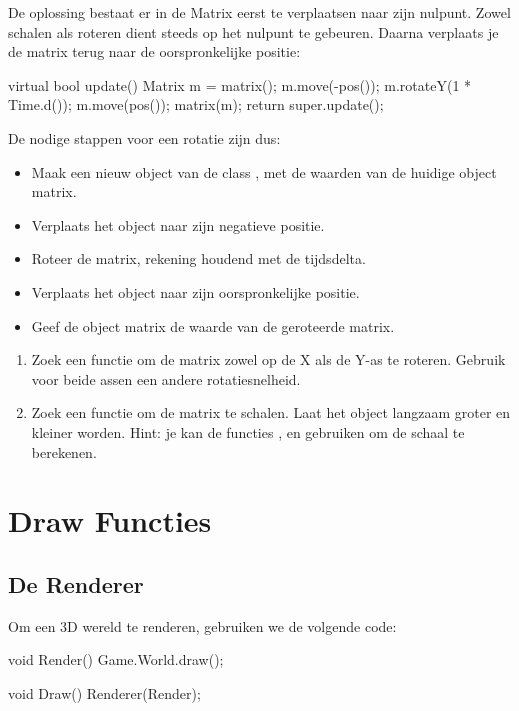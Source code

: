 De oplossing bestaat er in de Matrix eerst te verplaatsen naar zijn nulpunt. Zowel schalen als roteren dient steeds op het nulpunt te gebeuren. Daarna verplaats je de matrix terug naar de oorspronkelijke positie:

\begin{code}
virtual bool update()
{
	Matrix m = matrix();
	m.move(-pos());
	m.rotateY(1 * Time.d());
	m.move(pos());
	matrix(m);
	return super.update();
}
\end{code}

De nodige stappen voor een rotatie zijn dus:
\begin{itemize}
	\item Maak een nieuw object van de class , met de waarden van de huidige object matrix.
	\item Verplaats het object naar zijn negatieve positie.
	\item Roteer de matrix, rekening houdend met de tijdsdelta.
	\item Verplaats het object naar zijn oorspronkelijke positie.
	\item Geef de object matrix de waarde van de geroteerde matrix.
\end{itemize}

\begin{exercise}
\begin{enumerate}
	\item Zoek een functie om de matrix zowel op de X als de Y-as te roteren. Gebruik voor beide assen een andere rotatiesnelheid.
	\item Zoek een functie om de matrix te schalen. Laat het object langzaam groter en kleiner worden. Hint: je kan de functies ,  en  gebruiken om de schaal te berekenen.
\end{enumerate}
\end{exercise}

\section{Draw Functies}
\subsection{De Renderer}

Om een 3D wereld te renderen, gebruiken we de volgende code:

\begin{code}
void Render() {
   Game.World.draw();
}

void Draw() {
   Renderer(Render);
}
\end{code}

